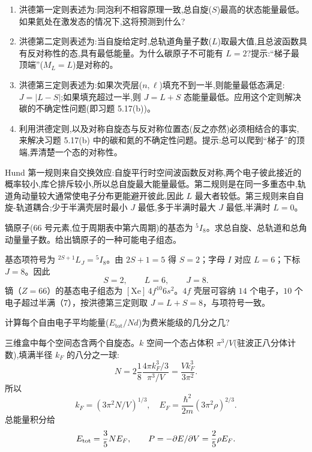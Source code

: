 \begin{question}
\begin{enumerate}
\item 洪德第一定则表述为:同泡利不相容原理一致,总自旋($S$)最高的状态能量最低。如果氦处在激发态的情况下,这将预测到什么?
\item 洪德第二定则表述为:当自旋给定时,总轨道角量子数($L$)取最大值,且总波函数具有反对称性的态,具有最低能量。为什么碳原子不可能有 $L=2$?提示:“梯子最顶端”($M_L=L$)是对称的。
\item 洪德第三定则表述为:如果次壳层($n,\ell$)填充不到一半,则能量最低态满足:$J=|L-S|$;如果填充超过一半,则 $J=L+S$ 态能量最低。应用这个定则解决碳的不确定性问题(即习题 5.17(b))。
\item 利用洪德定则,以及对称自旋态与反对称位置态(反之亦然)必须相结合的事实,来解决习题 5.17(b) 中的碳和氮的不确定性问题。提示:总可以爬到“梯子”的顶端,弄清楚一个态的对称性。
\end{enumerate}
\end{question}
\begin{solution}

Hund 第一规则来自交换效应:自旋平行时空间波函数反对称,两个电子彼此接近的概率较小,库仑排斥较小,所以总自旋最大能量最低。第二规则是在同一多重态中,轨道角动量较大通常使电子分布更能避开彼此,因此 $L$ 最大者较低。第三规则来自自旋-轨道耦合;少于半满壳层时最小 $J$ 最低,多于半满时最大 $J$ 最低,半满时 $L=0$。

\end{solution}

\begin{question}
镝原子(66 号元素,位于周期表中第六周期)的基态为 ${}^{5}I_{8}$。求总自旋、总轨道和总角动量量子数。给出镝原子的一种可能电子组态。
\end{question}
\begin{solution}

基态项符号为 ${}^{2S+1}L_J={}^{5}I_{8}$。由 $2S+1=5$ 得 $S=2$；字母 $I$ 对应 $L=6$；下标 $J=8$。因此
\[
S=2,\qquad L=6,\qquad J=8.
\]
镝（$Z=66$）的基态电子组态为 $[\mathrm{Xe}]\,4f^{10}6s^2$。$4f$ 壳层可容纳 $14$ 个电子，$10$ 个电子超过半满（$7$），按洪德第三定则取 $J=L+S=8$，与项符号一致。

\end{solution}

\begin{question}
计算每个自由电子平均能量($E_{\mathrm{tot}}/Nd$)为费米能级的几分之几?
\end{question}
\begin{solution}

三维盒中每个空间态含两个自旋态。$k$ 空间一个态占体积 $\pi^3/V$(驻波正八分体计数),填满半径 $k_F$ 的八分之一球:
\[
N=2\frac{1}{8}\frac{4\pi k_F^3/3}{\pi^3/V}=\frac{Vk_F^3}{3\pi^2}.
\]
所以
\[
k_F=(3\pi^2N/V)^{1/3},
\quad
E_F=\frac{\hbar^2}{2m}(3\pi^2\rho)^{2/3}.
\]
总能量积分给
\[
E_{\rm tot}=\frac35NE_F,
\qquad
P=-\partial E/\partial V=\frac25\rho E_F.
\]

\end{solution}

